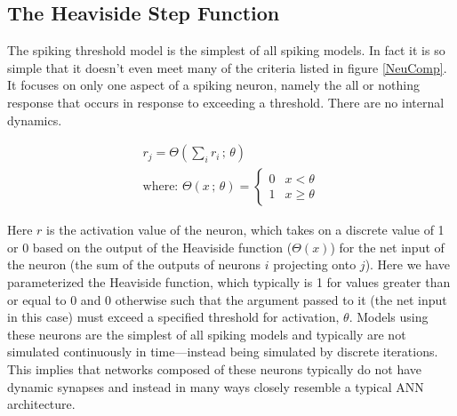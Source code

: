 
\subsection{The Heaviside Step Function}

The spiking threshold model is the simplest of all spiking models. In fact it is so simple that it doesn't even meet many of the criteria listed in figure \ref{NeuComp}. It focuses on only one aspect of a spiking neuron, namely the all or nothing response that occurs in response to exceeding a threshold. There are no internal dynamics.

\begin{eqnarray*}
	r_j= \Theta\left(\sum_{i} r_i\,;\, \theta\right) \\
	\text{where: } \Theta\left( x\,;\, \theta \right) = \begin{cases}
	0 & x < \theta\\
	1 & x \geq \theta
	\end{cases}
\end{eqnarray*}

Here $r$ is the activation value of the neuron, which takes on a discrete value of 1 or 0 based on the output of the Heaviside function ($\Theta(x)$) for the net input of the neuron (the sum of the outputs of neurons $i$ projecting onto $j$). Here we have parameterized the Heaviside function, which typically is 1 for values greater than or equal to 0 and 0 otherwise such that the argument passed to it (the net input in this case) must exceed a specified threshold for activation, $\theta$. Models using these neurons are the simplest of all spiking models and typically are not simulated continuously in time---instead being simulated by discrete iterations. This implies that networks composed of these neurons typically do not have dynamic synapses and instead in many ways closely resemble a typical ANN architecture.

